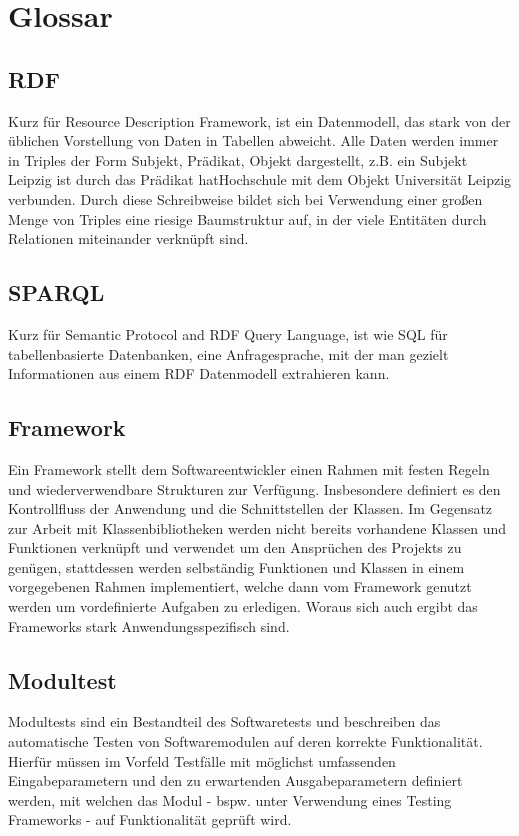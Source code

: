 \section{Glossar}

    \subsection{RDF}
    Kurz für Resource Description Framework, ist ein Datenmodell, 
    das stark von der üblichen Vorstellung von Daten in Tabellen 
    abweicht. Alle Daten werden immer in Triples der Form Subjekt,
    Prädikat, Objekt dargestellt, z.B. ein Subjekt Leipzig ist durch 
    das Prädikat hatHochschule mit
    dem Objekt Universität Leipzig verbunden. Durch diese 
    Schreibweise bildet sich bei Verwendung einer großen Menge von 
    Triples eine riesige Baumstruktur auf, in der viele Entitäten 
    durch Relationen miteinander verknüpft sind.

    \subsection{SPARQL}
    Kurz für Semantic Protocol and RDF Query Language, ist wie SQL für 
    tabellenbasierte Datenbanken, eine Anfragesprache, mit der man gezielt 
    Informationen aus einem RDF Datenmodell extrahieren kann.

    \subsection{Framework}
    Ein Framework stellt dem Softwareentwickler einen Rahmen mit festen Regeln und 
    wiederverwendbare Strukturen zur Verfügung. Insbesondere definiert es den 
    Kontrollfluss der Anwendung und die Schnittstellen der Klassen. Im Gegensatz 
    zur Arbeit mit Klassenbibliotheken werden nicht bereits vorhandene Klassen und 
    Funktionen verknüpft und verwendet um den Ansprüchen des Projekts zu genügen, 
    stattdessen werden selbständig Funktionen und Klassen in einem vorgegebenen 
    Rahmen implementiert, welche dann vom Framework genutzt werden um 
    vordefinierte Aufgaben zu erledigen. Woraus sich auch ergibt das Frameworks 
    stark Anwendungsspezifisch sind.

    \subsection{Modultest}
    Modultests sind ein Bestandteil des Softwaretests und beschreiben das 
    automatische Testen von Softwaremodulen auf deren korrekte Funktionalität. 
    Hierfür müssen im Vorfeld Testfälle mit möglichst umfassenden 
    Eingabeparametern und den zu erwartenden Ausgabeparametern definiert werden, 
    mit welchen das Modul - bspw. unter Verwendung eines Testing Frameworks -
    auf Funktionalität geprüft wird.    

